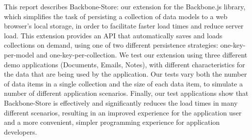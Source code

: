 \documentclass[12pt]{article}
\begin{document}
This report describes Backbone-Store: our extension for the Backbone.js library, which
simplifies the task of persisting a collection of data models to a web
browser's local storage, in order to facilitate faster load times and reduce
server load. This extension provides an API that automatically saves and loads collections on demand, using one of two different persistence strategies: one-key-per-model and one-key-per-collection. We test our extension using three different demo applications (Documents, Emails, Notes), with different characteristics for the data that are being used by the application. Our tests
vary both the number of data items in a single collection and the size of
each data item, to simulate a number of different application scenarios. Finally, our
test applications show that Backbone-Store is effectively and significantly reduces the load times in many different scenarios, resulting in an improved experience for the application
user and a more convenient, simpler programming experience for application developers. 



\end{document}
